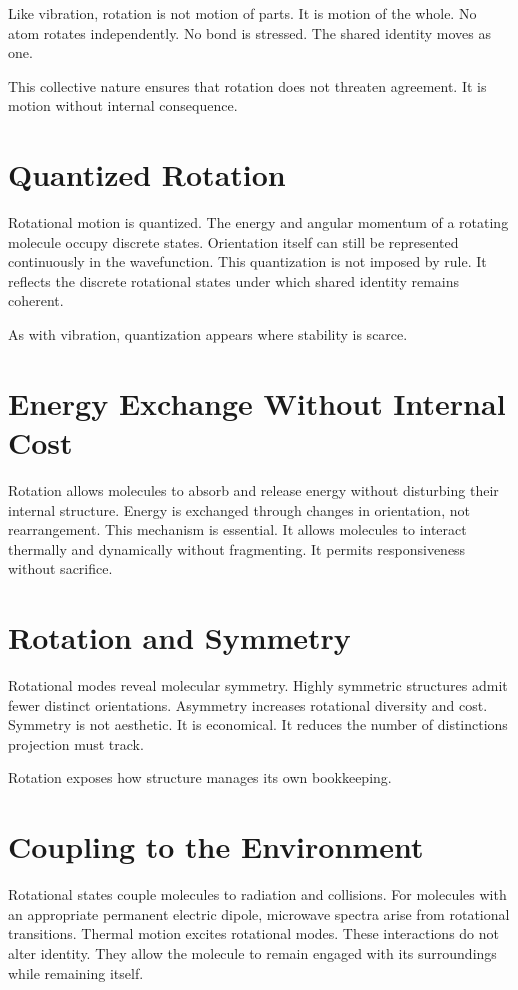 \documentclass[11pt,twoside,openright]{book}
\begin{document}
Like vibration, rotation is not motion of parts. It is motion of the whole. No atom rotates independently. No bond is stressed. The shared identity moves as one.

This collective nature ensures that rotation does not threaten agreement. It is motion without internal consequence.

\section*{Quantized Rotation}

Rotational motion is quantized. The energy and angular momentum of a rotating molecule occupy discrete states. Orientation itself can still be represented continuously in the wavefunction. This quantization is not imposed by rule. It reflects the discrete rotational states under which shared identity remains coherent.

As with vibration, quantization appears where stability is scarce.

\section*{Energy Exchange Without Internal Cost}

Rotation allows molecules to absorb and release energy without disturbing their internal structure. Energy is exchanged through changes in orientation, not rearrangement. This mechanism is essential. It allows molecules to interact thermally and dynamically without fragmenting. It permits responsiveness without sacrifice.

\section*{Rotation and Symmetry}

Rotational modes reveal molecular symmetry. Highly symmetric structures admit fewer distinct orientations. Asymmetry increases rotational diversity and cost. Symmetry is not aesthetic. It is economical. It reduces the number of distinctions projection must track.

Rotation exposes how structure manages its own bookkeeping.

\section*{Coupling to the Environment}

Rotational states couple molecules to radiation and collisions. For molecules with an appropriate permanent electric dipole, microwave spectra arise from rotational transitions. Thermal motion excites rotational modes. These interactions do not alter identity. They allow the molecule to remain engaged with its surroundings while remaining itself.
\end{document}
